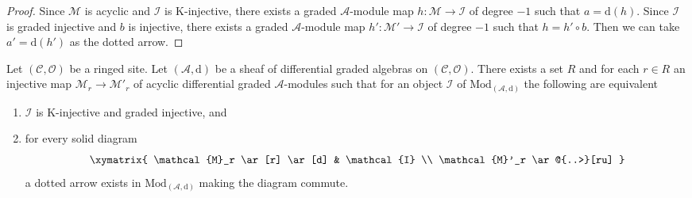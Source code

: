 \begin{proof}
Since $\mathcal{M}$ is acyclic and $\mathcal{I}$ is K-injective,
there exists a graded $\mathcal{A}$-module map
$h : \mathcal{M} \to \mathcal{I}$ of degree $-1$
such that $a = \text{d}(h)$. Since $\mathcal{I}$ is graded injective
and $b$ is injective, there exists a graded $\mathcal{A}$-module
map $h' : \mathcal{M}' \to \mathcal{I}$ of degree $-1$
such that $h = h' \circ b$. Then we can take $a' = \text{d}(h')$
as the dotted arrow.
\end{proof}

\begin{lemma}
\label{lemma-better-set-of-monos}
Let $(\mathcal{C}, \mathcal{O})$ be a ringed site.
Let $(\mathcal{A}, \text{d})$
be a sheaf of differential graded algebras on $(\mathcal{C}, \mathcal{O})$.
There exists a set $R$ and for each $r \in R$ an injective map
$\mathcal{M}_r \to \mathcal{M}'_r$ of
acyclic differential graded $\mathcal{A}$-modules
such that for an object $\mathcal{I}$ of $\text{Mod}_{(\mathcal{A}, \text{d})}$
the following are equivalent
\begin{enumerate}
\item $\mathcal{I}$ is K-injective and graded injective, and
\item for every solid diagram
$$
\xymatrix{
\mathcal{M}_r \ar[r] \ar[d] & \mathcal{I} \\
\mathcal{M}'_r \ar@{..>}[ru]
}
$$
a dotted arrow exists in $\text{Mod}_{(\mathcal{A}, \text{d})}$
making the diagram commute.
\end{enumerate}
\end{lemma}

